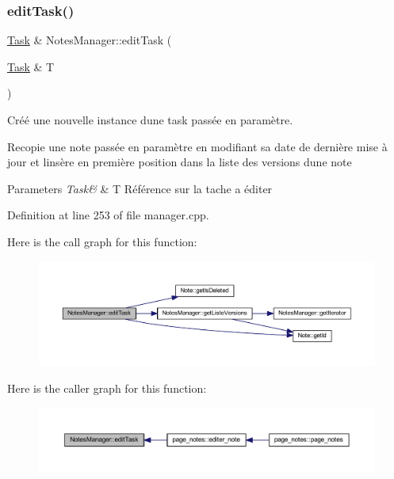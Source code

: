 \subsubsection{\texorpdfstring{edit\+Task()}{editTask()}}
{\footnotesize\ttfamily \hyperlink{class_task}{Task} \& Notes\+Manager\+::edit\+Task (\begin{DoxyParamCaption}\item[{\hyperlink{class_task}{Task} \&}]{T }\end{DoxyParamCaption})}



Créé une nouvelle instance d\textquotesingle{}une task passée en paramètre. 

Recopie une note passée en paramètre en modifiant sa date de dernière mise à jour et l\textquotesingle{}insère en première position dans la liste des versions d\textquotesingle{}une note 
\begin{DoxyParams}{Parameters}
{\em Task\&} & T Référence sur la tache a éditer \\
\hline
\end{DoxyParams}


Definition at line 253 of file manager.\+cpp.

Here is the call graph for this function\+:\nopagebreak
\begin{figure}[H]
\begin{center}
\leavevmode
\includegraphics[width=350pt]{class_notes_manager_a8f8f2b6aaa8c7d41356f9e4be7da2da5_cgraph}
\end{center}
\end{figure}
Here is the caller graph for this function\+:\nopagebreak
\begin{figure}[H]
\begin{center}
\leavevmode
\includegraphics[width=350pt]{class_notes_manager_a8f8f2b6aaa8c7d41356f9e4be7da2da5_icgraph}
\end{center}
\end{figure}
\mbox{\label{class_notes_manager_a84e962ad7fa999cbb687fb43c1b3bab4}} 
